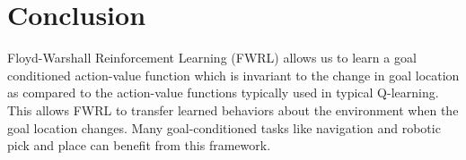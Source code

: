 \section{Conclusion}
Floyd-Warshall Reinforcement Learning (FWRL) allows us to learn a goal
conditioned action-value function which is invariant to the change in
goal location as compared to the action-value functions typically used
in typical Q-learning.  This allows FWRL to transfer learned behaviors
about the environment when the goal location changes. Many
goal-conditioned tasks like navigation and robotic pick and place can
benefit from this framework.
